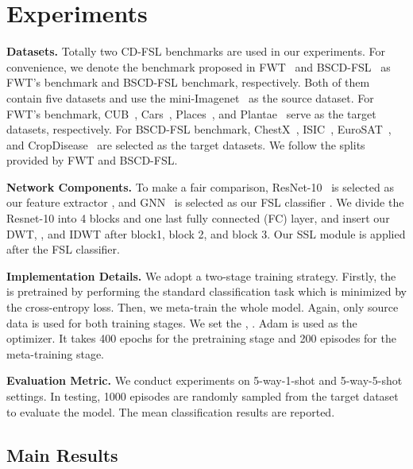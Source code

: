 \documentclass{article}
\newcommand{\fyq}{\textcolor{black}}
\begin{document}
	
\section{Experiments}
\noindent\textbf{Datasets.} Totally two CD-FSL benchmarks are used in our experiments. For convenience, we denote the benchmark proposed in FWT~\cite{tseng2020cross} and BSCD-FSL~\cite{guo2020broader} as FWT's benchmark and BSCD-FSL benchmark, respectively. Both of them contain five datasets and use the mini-Imagenet~\cite{deng2009imagenet} as the source dataset. For FWT's benchmark, CUB~\cite{wah2011caltech}, Cars~\cite{krause20133d}, Places~\cite{zhou2017places}, and Plantae~\cite{van2018inaturalist} serve as the target datasets, respectively. For BSCD-FSL benchmark, ChestX~\cite{wang2017chestx}, ISIC~\cite{tschandl2018ham10000,codella2019skin}, EuroSAT~\cite{helber2019eurosat}, and CropDisease~\cite{mohanty2016using} are selected as the target datasets. We follow the splits provided by FWT and BSCD-FSL. 

	
	
\noindent\textbf{Network Components.} 
To make a fair comparison, ResNet-10~\cite{he2016deep} is selected as our feature extractor , and GNN~\cite{garcia2017few} is selected as our FSL classifier . We divide the Resnet-10 into 4 blocks and one last fully connected (FC) layer, and insert our DWT, , and IDWT after block1, block 2, and block 3.  Our SSL module  is applied after the FSL classifier.
	
	
\noindent\textbf{Implementation Details.} 
We adopt a two-stage training strategy. Firstly, the   is pretrained by performing the standard classification task which is minimized \fyq{by} the cross-entropy loss. Then, we meta-train the whole model. Again, only source data is used for both training stages. We set the , . 
Adam is used as the optimizer. It takes 400 epochs for the pretraining stage and 200 episodes for the meta-training stage.
	
\noindent\textbf{Evaluation Metric.} We conduct experiments on 5-way-1-shot and 5-way-5-shot settings. In testing, 1000 episodes are randomly sampled from the target dataset to evaluate the model. The mean classification results are reported. 
	
	


	
	
	
	
	
\subsection{Main Results}
	
\end{document}
